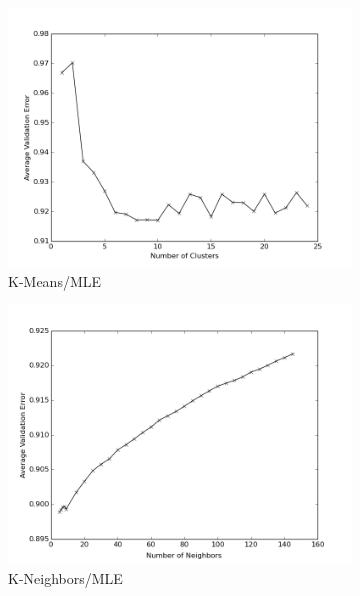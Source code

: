 \documentclass[11pt]{article}
\begin{document}
\begin{figure}[h!]
    \begin{subfigure}[h!]{0.33\textwidth}
        \includegraphics[width=\textwidth]{kmeans_mle.png}
        \caption{K-Means/MLE}
        \label{fig:kmMLE}
    \end{subfigure}%
    \begin{subfigure}[h!]{0.33\textwidth}
        \includegraphics[width=\textwidth]{KN_mle.png}
        \caption{K-Neighbors/MLE}
        \label{fig:knMLE}
    \end{subfigure}
    \begin{subfigure}[h!]{0.33\textwidth}

\end{subfigure}
\end{figure}
\end{document}
